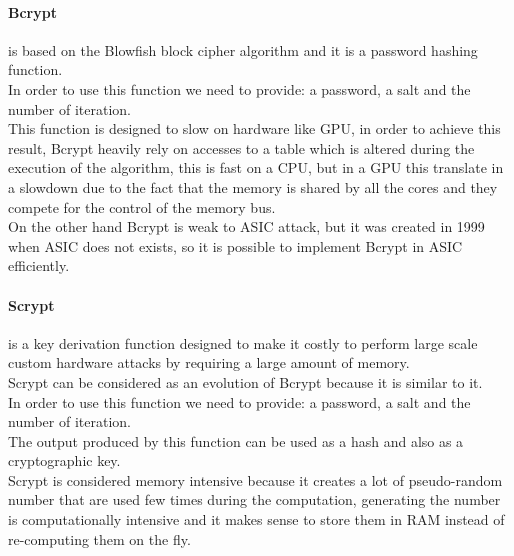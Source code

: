 \paragraph{Bcrypt} is based on the Blowfish block cipher algorithm and it is a password hashing function.\\
In order to use this function we need to provide: a password, a salt and the number of iteration.\\
This function is designed to slow on hardware like GPU, in order to achieve this result, Bcrypt heavily rely on accesses to a table which is altered during the execution of the algorithm, this is fast on a CPU, but in a GPU this translate in a slowdown due to the fact that the memory is shared by all the cores and they compete for the control of the memory bus.\\
On the other hand Bcrypt is weak to ASIC attack, but it was created in 1999 when ASIC does not exists, so it is possible to implement Bcrypt in ASIC efficiently.\\

\paragraph{Scrypt} is a key derivation function designed to make it costly to perform large scale custom hardware attacks by requiring a large amount of memory.\\
Scrypt can be considered as an evolution of Bcrypt because it is similar to it.\\
In order to use this function we need to provide: a password, a salt and the number of iteration.\\
The output produced by this function can be used as a hash and also as a cryptographic key.\\
Scrypt is considered memory intensive because it creates a lot of pseudo-random number that are used few times during the computation, generating the number is computationally intensive and it makes sense to store them in RAM instead of re-computing them on the fly.\\


